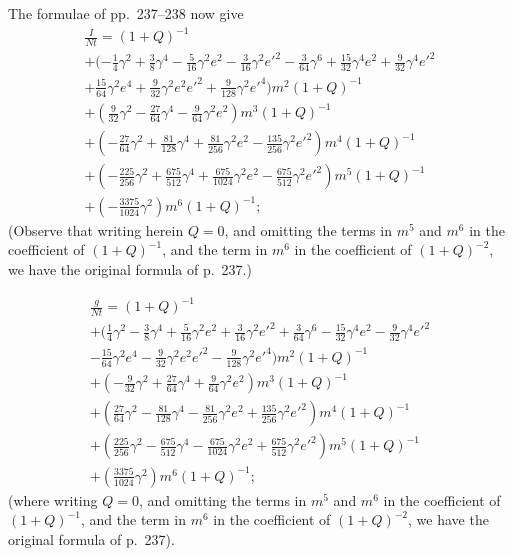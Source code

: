 \documentclass[11pt,a4paper]{article}
\theoremstyle{plain}
\theoremstyle{definition}
\theoremstyle{remark}
\begin{document}
The formulae of pp.\ 237--238 now give
\begin{multline*}
\frac{I}{Nt}=(1+Q)^{-1}\\
+(-\tfrac14 \gamma^{2} + \tfrac{3}{8}\gamma^{4} - \tfrac{5}{16}\gamma^{2}e^{2} - \tfrac{3}{16}\gamma^{2}e'^{2} - \tfrac{3}{64}\gamma^{6} + \tfrac{15}{32}\gamma^{4}e^{2} + \tfrac{9}{32}\gamma^{4}e'^{2}\\
+ \tfrac{15}{64}\gamma^{2}e^{4} + \tfrac{9}{32}\gamma^{2}e^{2}e'^{2} + \tfrac{9}{128}\gamma^{2}e'^{4})m^{2}(1+Q)^{-1}\\
+(\tfrac{9}{32}\gamma^{2} - \tfrac{27}{64}\gamma^{4} - \tfrac{9}{64}\gamma^{2}e^{2})m^{3}(1+Q)^{-1}\\
+(-\tfrac{27}{64}\gamma^{2} + \tfrac{81}{128}\gamma^{4} + \tfrac{81}{256}\gamma^{2}e^{2} - \tfrac{135}{256}\gamma^{2}e'^{2})m^{4}(1+Q)^{-1}\\
+(-\tfrac{225}{256}\gamma^{2} + \tfrac{675}{512}\gamma^{4} + \tfrac{675}{1024}\gamma^{2}e^{2} - \tfrac{675}{512}\gamma^{2}e'^{2})m^{5}(1+Q)^{-1}\\
+(-\tfrac{3375}{1024}\gamma^{2})m^{6}(1+Q)^{-1};
\end{multline*}
(Observe that writing herein $Q=0$, and omitting the terms in $m^{5}$ and $m^{6}$ in the coefficient of $(1+Q)^{-1}$, and the term in $m^{6}$ in the coefficient of $(1+Q)^{-2}$, we have the original formula of p.~237.)

\begin{multline*}
\frac{g}{Nt}=(1+Q)^{-1}\\
+(\tfrac14 \gamma^{2} - \tfrac{3}{8}\gamma^{4} + \tfrac{5}{16}\gamma^{2}e^{2} + \tfrac{3}{16}\gamma^{2}e'^{2} + \tfrac{3}{64}\gamma^{6} - \tfrac{15}{32}\gamma^{4}e^{2} - \tfrac{9}{32}\gamma^{4}e'^{2}\\
- \tfrac{15}{64}\gamma^{2}e^{4} - \tfrac{9}{32}\gamma^{2}e^{2}e'^{2} - \tfrac{9}{128}\gamma^{2}e'^{4})m^{2}(1+Q)^{-1}\\
+(-\tfrac{9}{32}\gamma^{2} + \tfrac{27}{64}\gamma^{4} + \tfrac{9}{64}\gamma^{2}e^{2})m^{3}(1+Q)^{-1}\\
+(\tfrac{27}{64}\gamma^{2} - \tfrac{81}{128}\gamma^{4} - \tfrac{81}{256}\gamma^{2}e^{2} + \tfrac{135}{256}\gamma^{2}e'^{2})m^{4}(1+Q)^{-1}\\
+(\tfrac{225}{256}\gamma^{2} - \tfrac{675}{512}\gamma^{4} - \tfrac{675}{1024}\gamma^{2}e^{2} + \tfrac{675}{512}\gamma^{2}e'^{2})m^{5}(1+Q)^{-1}\\
+(\tfrac{3375}{1024}\gamma^{2})m^{6}(1+Q)^{-1};
\end{multline*}
(where writing $Q=0$, and omitting the terms in $m^{5}$ and $m^{6}$ in the coefficient of $(1+Q)^{-1}$, and the term in $m^{6}$ in the coefficient of $(1+Q)^{-2}$, we have the original formula of p.~237).
\end{document}

